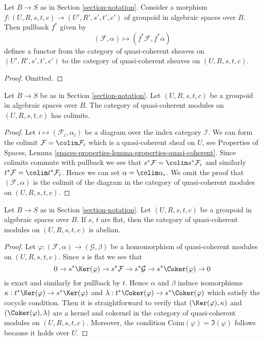 \begin{lemma}
\label{lemma-pullback}
Let $B \to S$ as in Section \ref{section-notation}.
Consider a morphism
$f : (U, R, s, t, c) \to (U', R', s', t', c')$
of groupoid in algebraic spaces over $B$. Then pullback $f^*$ given by
$$
(\mathcal{F}, \alpha) \mapsto (f^*\mathcal{F}, f^*\alpha)
$$
defines a functor from the category of quasi-coherent sheaves on
$(U', R', s', t', c')$ to the category of quasi-coherent sheaves on
$(U, R, s, t, c)$.
\end{lemma}

\begin{proof}
Omitted.
\end{proof}

\begin{lemma}
\label{lemma-colimits}
Let $B \to S$ be as in Section \ref{section-notation}.
Let $(U, R, s, t, c)$ be a groupoid in algebraic spaces over $B$.
The category of quasi-coherent modules on $(U, R, s, t, c)$ has colimits.
\end{lemma}

\begin{proof}
Let $i \mapsto (\mathcal{F}_i, \alpha_i)$ be a diagram over the index
category $\mathcal{I}$. We can form the colimit
$\mathcal{F} = \colim \mathcal{F}_i$
which is a quasi-coherent sheaf on $U$, see
Properties of Spaces, Lemma
\ref{spaces-properties-lemma-properties-quasi-coherent}.
Since colimits commute with pullback we see that
$s^*\mathcal{F} = \colim s^*\mathcal{F}_i$ and similarly
$t^*\mathcal{F} = \colim t^*\mathcal{F}_i$. Hence we can set
$\alpha = \colim \alpha_i$. We omit the proof that $(\mathcal{F}, \alpha)$
is the colimit of the diagram in the category of quasi-coherent modules
on $(U, R, s, t, c)$.
\end{proof}

\begin{lemma}
\label{lemma-abelian}
Let $B \to S$ as in Section \ref{section-notation}.
Let $(U, R, s, t, c)$ be a groupoid in algebraic spaces over $B$.
If $s$, $t$ are flat, then the category of quasi-coherent modules on
$(U, R, s, t, c)$ is abelian.
\end{lemma}

\begin{proof}
Let $\varphi : (\mathcal{F}, \alpha) \to (\mathcal{G}, \beta)$ be a
homomorphism of quasi-coherent modules on $(U, R, s, t, c)$. Since $s$ is flat
we see that
$$
0 \to s^*\Ker(\varphi)
\to s^*\mathcal{F} \to s^*\mathcal{G} \to s^*\Coker(\varphi) \to 0
$$
is exact and similarly for pullback by $t$. Hence $\alpha$ and $\beta$
induce isomorphisms
$\kappa : t^*\Ker(\varphi) \to s^*\Ker(\varphi)$ and
$\lambda : t^*\Coker(\varphi) \to s^*\Coker(\varphi)$
which satisfy the cocycle condition. Then it is straightforward to
verify that $(\Ker(\varphi), \kappa)$ and
$(\Coker(\varphi), \lambda)$ are a kernel and cokernel in the
category of quasi-coherent modules on $(U, R, s, t, c)$. Moreover,
the condition $\text{Coim}(\varphi) = \Im(\varphi)$ follows
because it holds over $U$.
\end{proof}






